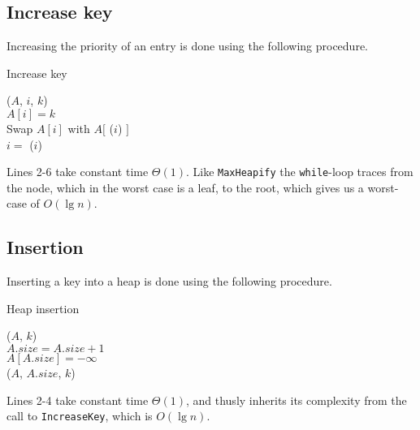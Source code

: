 \subsection{Increase key}
Increasing the priority of an entry is done using the following procedure. \\
\label{ch:heaps|sec:procedures|sub:increase-key}
\begin{algorithm}[H]
	\caption{Increase key}
	\label{alg:heap-increase-key}
	
	
	
	
	
	\BlankLine
	\IncreaseKey($A$, $i$, $k$) \\
	\Begin
	{
		$A[i] = k$ \\
		{
			Swap $A[i]$ with $A[$ \Parent($i$) $]$ \\
			$i = $ \Parent($i$)
		}
	}
\end{algorithm}
Lines 2-6 take constant time $\Theta(1)$. Like \texttt{MaxHeapify} the
\texttt{while}-loop traces from the node, which in the worst case is a leaf,
to the root, which gives us a worst-case of $O(\lg n)$.

\subsection{Insertion}
Inserting a key into a heap is done using the following procedure. \\
\label{ch:heaps|sec:procedures|sub:insertion}
\begin{algorithm}[H]
	\caption{Heap insertion}
	\label{alg:heap-insert}
	
	
	
	
	\BlankLine
	\Insert($A$, $k$) \\
	\Begin
	{
		$A.size = A.size + 1$ \\
		$A[A.size] = -\infty$ \\
		\IncreaseKey($A$, $A.size$, $k$)
	}
\end{algorithm}
Lines 2-4 take constant time $\Theta(1)$, and thusly inherits its complexity
from the call to \texttt{IncreaseKey}, which is $O(\lg n)$.

